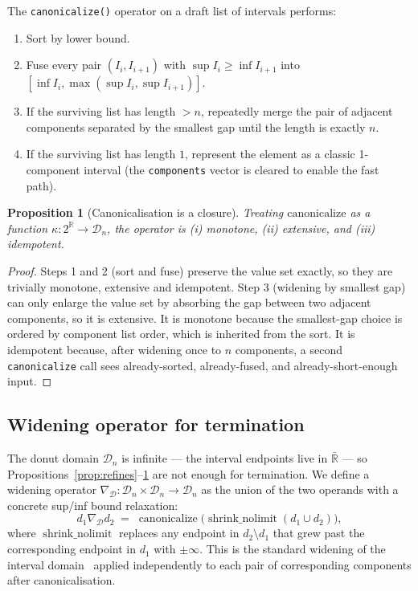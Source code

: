 \documentclass[11pt,a4paper]{article}
\theoremstyle{plain}
\newtheorem{proposition}{Proposition}
\begin{document}
The \texttt{canonicalize()} operator on a draft list of intervals
performs:
\begin{enumerate}
\item Sort by lower bound.
\item Fuse every pair $(I_i,I_{i+1})$ with $\sup I_i \ge \inf I_{i+1}$
      into $[\inf I_i,\max(\sup I_i,\sup I_{i+1})]$.
\item If the surviving list has length $>n$, repeatedly merge the pair
      of adjacent components separated by the smallest gap until the
      length is exactly $n$.
\item If the surviving list has length $1$, represent the element as a
      classic 1-component interval (the \texttt{components} vector is
      cleared to enable the fast path).
\end{enumerate}

\begin{proposition}[Canonicalisation is a closure]\label{prop:canon-closure}
Treating $\mathrm{canonicalize}$ as a function $\kappa\colon 2^{\mathbb{R}}\to\mathcal{D}_n$,
the operator is \emph{(i)} monotone, \emph{(ii)} extensive, and
\emph{(iii)} idempotent.
\end{proposition}
\begin{proof}
Steps 1 and 2 (sort and fuse) preserve the value set exactly, so they
are trivially monotone, extensive and idempotent. Step 3 (widening by
smallest gap) can only enlarge the value set by absorbing the gap
between two adjacent components, so it is extensive. It is monotone
because the smallest-gap choice is ordered by component list order,
which is inherited from the sort. It is idempotent because, after
widening once to $n$ components, a second \texttt{canonicalize} call
sees already-sorted, already-fused, and already-short-enough input.
\end{proof}

\subsection{Widening operator for termination}
\label{sec:widening}

The donut domain $\mathcal{D}_n$ is infinite --- the interval endpoints
live in $\bar{\mathbb{R}}$ --- so
Propositions~\ref{prop:refines}--\ref{prop:canon-closure} are not
enough for termination. We define a widening operator
$\nabla_{\mathcal{D}}\colon\mathcal{D}_n\times\mathcal{D}_n\to\mathcal{D}_n$
as the union of the two operands with a concrete sup/inf bound
relaxation:
\[
d_1 \nabla_{\mathcal{D}} d_2 \;=\; \operatorname{canonicalize}\big(\operatorname{shrink\_nolimit}(d_1\cup d_2)\big),
\]
where $\operatorname{shrink\_nolimit}$ replaces any endpoint in
$d_2\setminus d_1$ that grew past the corresponding endpoint in $d_1$
with $\pm\infty$. This is the standard widening of the interval
domain~\cite[p.~36]{history-ai} applied independently to each pair of
corresponding components after canonicalisation.
\end{document}
